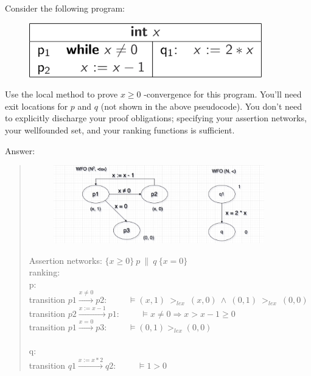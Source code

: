 \documentclass{article}
\begin{document}
\clearpage
\setcounter{question}{1}

\begin{Question} 
    Consider the following program:
\begin{figure}[H]
    \centering 
    \includegraphics[width=0.9\textwidth]{DV_demand2}
\end{figure}

\begin{Subquestion}
    Use the local method to prove $x\geq0$ -convergence for this program. You'll need exit locations for $p$ and $q$ (not shown in the above pseudocode). You don't need to explicitly discharge your proof obligations; specifying your assertion networks, your wellfounded set, and your ranking functions is sufficient.
    
\begin{answer}
    Answer:
    \begin{quote}
        \begin{figure}[H]
            \centering 
            \includegraphics[width=0.9\textwidth]{DV_demand4}
        \end{figure}
        Assertion networks: $\{x\geq 0 \}\ p\ \|\ q\ \{x = 0\}$\\
        ranking:\\
        p:\\
        transition $p1\stackrel{x\neq0}{\longrightarrow}p2$:\ \ \ \ \ $\models (x, 1)\ >_{lex}\ (x, 0)\ \land\ (0, 1)\ >_{lex}\ (0,0)$ \vspace{1em}\\
        transition $p2\stackrel{x:=x-1}{\longrightarrow}p1$:\ \ \ \ \ $\models x \neq 0 \Rightarrow x > x - 1 \geq 0$ \vspace{1em}\\
        transition $p1\stackrel{x=0}{\longrightarrow}p3$:\ \ \ \ \ $\models (0, 1) >_{lex} (0, 0) $ \\\\
        q:\\
        transition $q1\stackrel{x:=x*2}{\longrightarrow}q2$:\ \ \ \ \ $\models 1>0$ \vspace{1em}\\


\end{quote}
\end{answer}
\end{Subquestion}
\end{Question}
\end{document}
